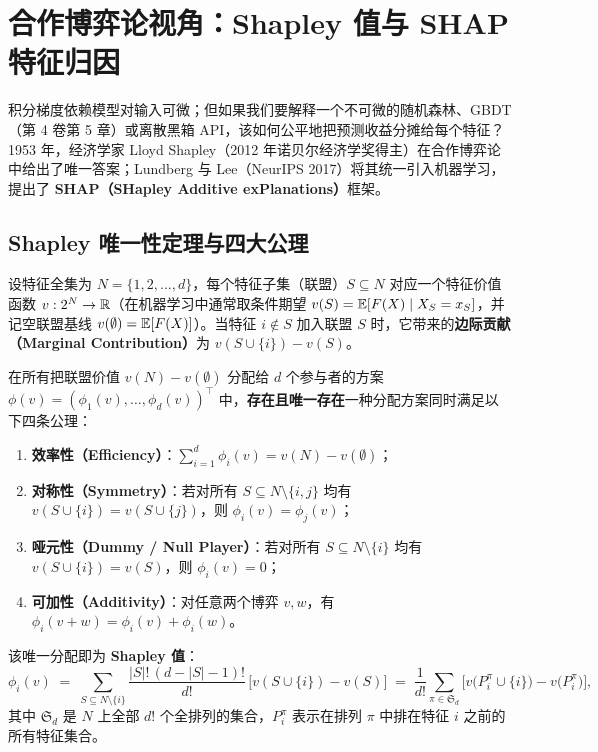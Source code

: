\section{合作博弈论视角：Shapley 值与 SHAP 特征归因}

积分梯度依赖模型对输入可微；但如果我们要解释一个不可微的随机森林、GBDT（第 4 卷第 5 章）或离散黑箱 API，该如何公平地把预测收益分摊给每个特征？1953 年，经济学家 Lloyd Shapley（2012 年诺贝尔经济学奖得主）在合作博弈论中给出了唯一答案；Lundberg 与 Lee（NeurIPS 2017）将其统一引入机器学习，提出了 \textbf{SHAP（SHapley Additive exPlanations）}框架。

\subsection{Shapley 唯一性定理与四大公理}

设特征全集为 $N = \{1, 2, \dots, d\}$，每个特征子集（联盟）$S \subseteq N$ 对应一个特征价值函数 $v: 2^N \to \mathbb{R}$（在机器学习中通常取条件期望 $v(S) = \mathbb{E}[F(X) \mid X_S = x_S]$，并记空联盟基线 $v(\emptyset) = \mathbb{E}[F(X)]$）。当特征 $i \notin S$ 加入联盟 $S$ 时，它带来的\textbf{边际贡献（Marginal Contribution）}为 $v(S \cup \{i\}) - v(S)$。

\begin{thmBox}
\begin{theorem}\label{thm:shapley}
在所有把联盟价值 $v(N) - v(\emptyset)$ 分配给 $d$ 个参与者的方案 $\phi(v) = (\phi_1(v), \dots, \phi_d(v))^\top$ 中，\textbf{存在且唯一存在}一种分配方案同时满足以下四条公理：
\begin{enumerate}
  \item \textbf{效率性（Efficiency）}：$\sum_{i=1}^d \phi_i(v) = v(N) - v(\emptyset)$；
  \item \textbf{对称性（Symmetry）}：若对所有 $S \subseteq N \setminus \{i, j\}$ 均有 $v(S \cup \{i\}) = v(S \cup \{j\})$，则 $\phi_i(v) = \phi_j(v)$；
  \item \textbf{哑元性（Dummy / Null Player）}：若对所有 $S \subseteq N \setminus \{i\}$ 均有 $v(S \cup \{i\}) = v(S)$，则 $\phi_i(v) = 0$；
  \item \textbf{可加性（Additivity）}：对任意两个博弈 $v, w$，有 $\phi_i(v + w) = \phi_i(v) + \phi_i(w)$。
\end{enumerate}
该唯一分配即为 \textbf{Shapley 值}：
\begin{equation}\label{eq:shapley-formula}
  \phi_i(v) \;=\; \sum_{S \subseteq N \setminus \{i\}} \frac{|S|!\,(d - |S| - 1)!}{d!}\,\Big[v(S \cup \{i\}) - v(S)\Big]
  \;=\; \frac{1}{d!}\sum_{\pi \in \mathfrak{S}_d} \Big[v\big(P_i^\pi \cup \{i\}\big) - v\big(P_i^\pi\big)\Big],
\end{equation}
其中 $\mathfrak{S}_d$ 是 $N$ 上全部 $d!$ 个全排列的集合，$P_i^\pi$ 表示在排列 $\pi$ 中排在特征 $i$ 之前的所有特征集合。
\end{theorem}
\end{thmBox}

